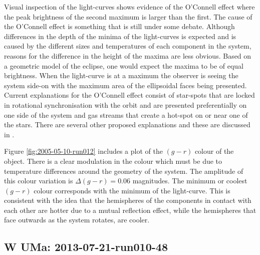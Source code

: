 Visual inspection of the light-curves shows evidence of the O'Connell effect where the peak brightness of the second maximum is larger than the first. The cause of the O'Connell effect is something that is still under some debate. Although differences in the depth of the minima of the light-curves is expected and is caused by the different sizes and temperatures of each component in the system, reasons for the difference in the height of the maxima are less obvious. Based on a geometric model of the eclipse, one would expect the maxima to be of equal brightness. When the light-curve is at a maximum the observer is seeing the system side-on with the maximum area of the ellipsoidal faces being presented. Current explanations for the O'Connell effect consist of star-spots that are locked in rotational synchronisation with the orbit and are presented preferentially on one side of the system and gas streams that create a hot-spot on or near one of the stars. There are several other proposed explanations and these are discussed in \citet{oconnelleffect}.  

Figure \ref{fig:2005-05-10-run012} includes a plot of the $(g-r)$ colour of the object. There is a clear modulation in the colour which must be due to temperature differences around the geometry of the system. The amplitude of this colour variation is $\Delta(g-r) = 0.06$ magnitudes. The minimum or coolest $(g - r)$ colour corresponds with the minimum of the light-curve. This is consistent with the idea that the hemispheres of the components in contact with each other are hotter due to a mutual reflection effect, while the hemispheres that face outwards as the system rotates, are cooler. 

\subsection{{W UMa}: 2013-07-21-run010-48}

